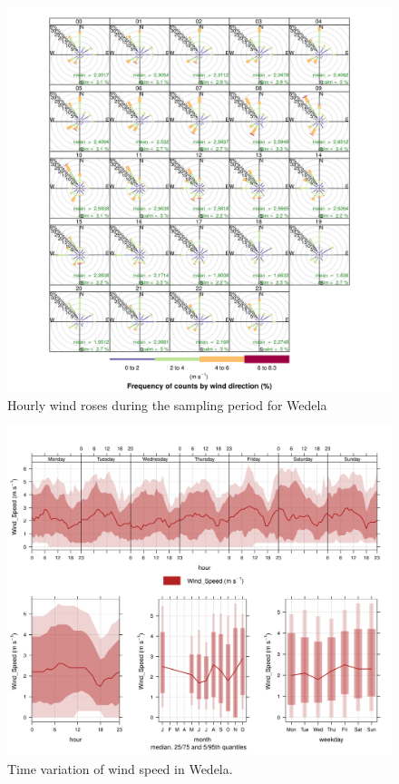 \documentclass{nwureport}
\begin{document}
\begin{figure}[!htb]
    \centering
    \includegraphics[width=\textwidth]{images/Wedela-windrose-hourly.png}
    \caption[Hourly wind roses for Wedela]{Hourly wind roses during the sampling period for Wedela}
    \label{fig:windrose-hourly}
\end{figure}

\begin{figure}[!htb]
    \centering
    \includegraphics[width=\textwidth]{images/Wedela_Wind_Speed_timevary.png}
    \caption{Time variation of wind speed in Wedela.}
    \label{fig:timevary-winds}
\end{figure}
\end{document}
